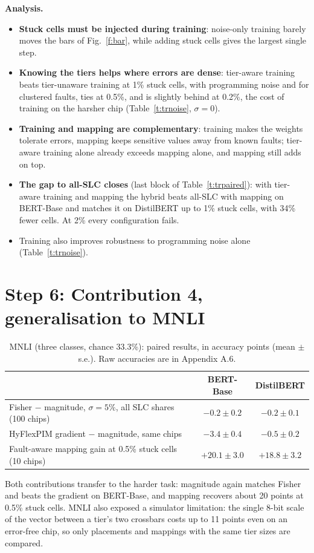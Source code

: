 \documentclass[10pt,a4paper]{article}
\begin{document}
\noindent\textbf{Analysis.}
\begin{itemize}
\item \textbf{Stuck cells must be injected during training}: noise-only training barely moves the bars of
Fig.~\ref{f:bar}, while adding stuck cells gives the largest single step.
\item \textbf{Knowing the tiers helps where errors are dense}: tier-aware training beats tier-unaware training
at 1\% stuck cells, with programming noise and for clustered faults, ties at 0.5\%, and is slightly behind at
0.2\%, the cost of training on the harsher chip (Table~\ref{t:trnoise}, $\sigma=0$).
\item \textbf{Training and mapping are complementary}: training makes the weights tolerate errors, mapping
keeps sensitive values away from known faults; tier-aware training alone already exceeds mapping alone, and
mapping still adds on top.
\item \textbf{The gap to all-SLC closes} (last block of Table~\ref{t:trpaired}): with tier-aware training and
mapping the hybrid beats all-SLC with mapping on BERT-Base and matches it on DistilBERT up to 1\% stuck cells,
with 34\% fewer cells. At 2\% every configuration fails.
\item Training also improves robustness to programming noise alone (Table~\ref{t:trnoise}).
\end{itemize}

\section*{Step 6: Contribution 4, generalisation to MNLI}
\begin{table}[H]
\centering\small
\caption{MNLI (three classes, chance 33.3\%): paired results, in accuracy points (mean $\pm$ s.e.). Raw
accuracies are in Appendix A.6.}\label{t:mnli}
\begin{tabular}{@{}lcc@{}}
\toprule
& BERT-Base & DistilBERT \\
\midrule
Fisher $-$ magnitude, $\sigma=5\%$, all SLC shares (100 chips) & $-0.2\pm0.2$ & $-0.2\pm0.1$ \\
HyFlexPIM gradient $-$ magnitude, same chips & $-3.4\pm0.4$ & $-0.5\pm0.2$ \\
Fault-aware mapping gain at 0.5\% stuck cells (10 chips) & $+20.1\pm3.0$ & $+18.8\pm3.2$ \\
\bottomrule
\end{tabular}
\end{table}
\noindent Both contributions transfer to the harder task: magnitude again matches Fisher and beats the
gradient on BERT-Base, and mapping recovers about 20 points at 0.5\% stuck cells. MNLI also exposed a
simulator limitation: the single 8-bit scale of the vector between a tier's two crossbars costs up to 11
points even on an error-free chip, so only placements and mappings with the same tier sizes are compared.
\end{document}
